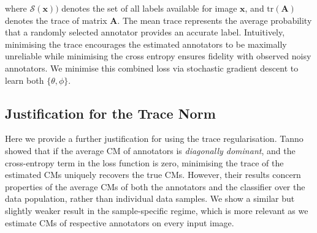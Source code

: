 where $\mathcal{S}({\textbf{x}}))$ denotes the set of all labels available for image $\textbf{x}$, and $\text{tr}({\textbf{A}})$ denotes the trace of matrix $\textbf{A}$. The mean trace represents the average probability that a randomly selected annotator provides an accurate label. Intuitively, minimising the trace encourages the estimated annotators to be maximally unreliable while minimising the cross entropy ensures fidelity with observed noisy annotators. We minimise this combined loss via stochastic gradient descent to learn both $\{ \theta ,\phi\}$.  %


\subsection{Justification for the Trace Norm}\label{sec:trace_theory}
\vspace{-2mm}

Here we provide a further justification for using the trace regularisation. Tanno \etal \cite{tanno2019learning} showed that if the average CM of annotators is \textit{diagonally dominant}, and the cross-entropy term in the loss function is zero, minimising the trace of the estimated CMs uniquely recovers the true CMs. However, their results concern properties of the average CMs of both the annotators and the classifier over the data population, rather than individual data samples. We show a similar but slightly weaker result in the sample-specific regime, which is more relevant as we estimate CMs of respective annotators on every input image. 

